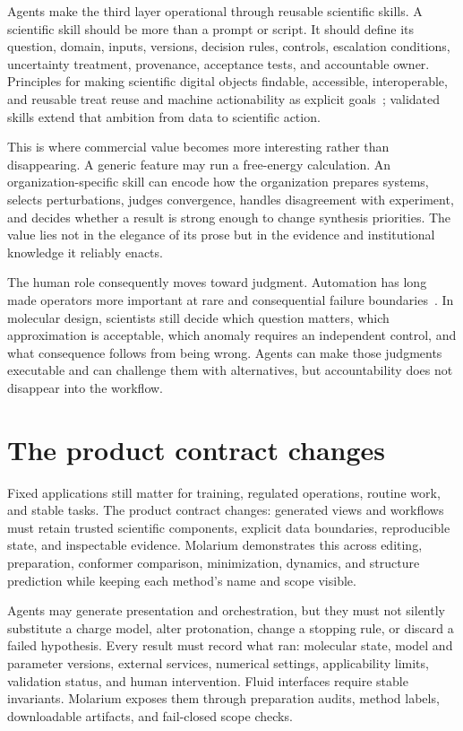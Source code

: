 \documentclass[10pt]{article}
\begin{document}
Agents make the third layer operational through reusable scientific skills.
A scientific skill should be more than a prompt or script.
It should define its question, domain, inputs, versions, decision rules, controls, escalation conditions, uncertainty treatment, provenance, acceptance tests, and accountable owner.
Principles for making scientific digital objects findable, accessible, interoperable, and reusable treat reuse and machine actionability as explicit goals~\cite{wilkinson2016fair}; validated skills extend that ambition from data to scientific action.

\begingroup{}
This is where commercial value becomes more interesting rather than disappearing.
A generic feature may run a free-energy calculation.
An organization-specific skill can encode how the organization prepares systems, selects perturbations, judges convergence, handles disagreement with experiment, and decides whether a result is strong enough to change synthesis priorities.
The value lies not in the elegance of its prose but in the evidence and institutional knowledge it reliably enacts.
\par\endgroup

The human role consequently moves toward judgment.
Automation has long made operators more important at rare and consequential failure boundaries~\cite{bainbridge1983ironies}.
In molecular design, scientists still decide which question matters, which approximation is acceptable, which anomaly requires an independent control, and what consequence follows from being wrong.
Agents can make those judgments executable and can challenge them with alternatives, but accountability does not disappear into the workflow.

\section*{The product contract changes}

Fixed applications still matter for training, regulated operations, routine work, and stable tasks.
The product contract changes: generated views and workflows must retain trusted scientific components, explicit data boundaries, reproducible state, and inspectable evidence.
Molarium demonstrates this across editing, preparation, conformer comparison, minimization, dynamics, and structure prediction while keeping each method's name and scope visible.

Agents may generate presentation and orchestration, but they must not silently substitute a charge model, alter protonation, change a stopping rule, or discard a failed hypothesis.
Every result must record what ran: molecular state, model and parameter versions, external services, numerical settings, applicability limits, validation status, and human intervention.
Fluid interfaces require stable invariants.
Molarium exposes them through preparation audits, method labels, downloadable artifacts, and fail-closed scope checks.
\end{document}
